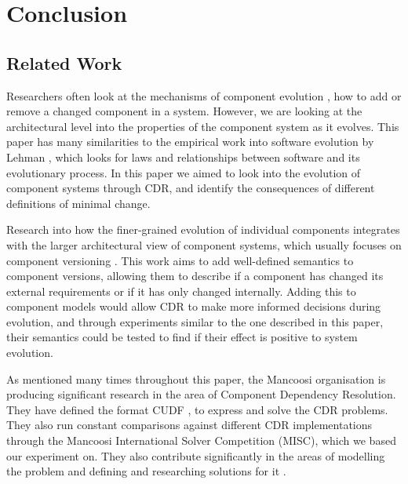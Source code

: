 \chapter{Conclusion}
\label{conclusion}






\section{Related Work}
Researchers often look at the mechanisms of component evolution \cite{Wang2006}, how to add or remove a changed component in a system.  
However, we are looking at the architectural level into the properties of the component system as it evolves.
This paper has many similarities to the empirical work into software evolution by Lehman \cite{lehman1980},
which looks for laws and relationships between software and its evolutionary process.
In this paper we aimed to look into the evolution of component systems through CDR,
and identify the consequences of different definitions of minimal change. 

Research into how the finer-grained evolution of individual components integrates with the larger architectural view of component systems, which
usually focuses on component versioning \cite{Bauml2009,Stuckenholz2005}.
This work aims to add well-defined semantics to component versions, 
allowing them to describe if a component has changed its external requirements or if it has only changed internally.
Adding this to component models would allow CDR to make more informed decisions during evolution, 
and through experiments similar to the one described in this paper,
their semantics could be tested to find if their effect is positive to system evolution.

As mentioned many times throughout this paper, 
the Mancoosi organisation is producing significant research in the area of Component Dependency Resolution.
They have defined the format CUDF \cite{treinen2009common}, to express and solve the CDR problems.
They also run constant comparisons against different CDR implementations through the Mancoosi International Solver Competition (MISC),
which we based our experiment on.
They also contribute significantly in the areas of modelling the problem \cite{Cosmo2010} 
and defining and researching solutions for it \cite{Trezentos2010}.

